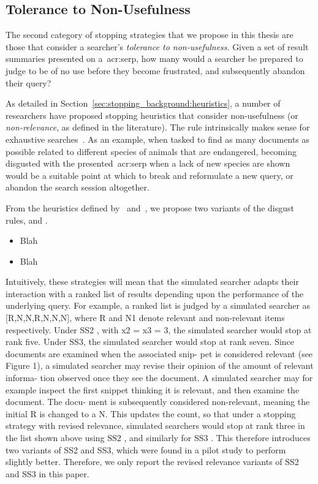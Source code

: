 \subsection{Tolerance to Non-Usefulness}
The second category of stopping strategies that we propose in this thesis are those that consider a searcher's \emph{tolerance to non-usefulness}. Given a set of result summaries presented on a~\gls{acr:serp}, how many would a searcher be prepared to judge to be of no use before they become frustrated, and subsequently abandon their query?

As detailed in Section~\ref{sec:stopping_background:heuristics}, a number of researchers have proposed stopping heuristics that consider non-usefulness (or \emph{non-relevance}, as defined in the literature). The rule intrinsically makes sense for exhaustive searches~\cite{kraft1979stopping_rules}. As an example, when tasked to find as many documents as possible related to different species of animals that are endangered, becoming disgusted with the presented~\gls{acr:serp} when a lack of new species are shown would be a suitable point at which to break and reformulate a new query, or abandon the search session altogether.

From the heuristics defined by~\citealt{cooper1973retrieval_effectiveness_ii} and~\citealt{kraft1979stopping_rules}, we propose two variants of the disgust rules,  and .

\begin{itemize}
    
    \item[]{} Blah
    
    \item[]{} Blah
    
\end{itemize}

Intuitively, these strategies will mean that the simulated searcher adapts their interaction with a ranked list of results depending upon the performance of the underlying query. For example, a ranked list is judged by a simulated searcher as [R,N,N,R,N,N,N], where R and N1 denote relevant and non-relevant items respectively. Under SS2 , with x2 = x3 = 3, the simulated searcher would stop at rank five. Under SS3, the simulated searcher would stop at rank seven.
Since documents are examined when the associated snip- pet is considered relevant (see Figure 1), a simulated searcher may revise their opinion of the amount of relevant informa- tion observed once they see the document. A simulated searcher may for example inspect the first snippet thinking it is relevant, and then examine the document. The docu- ment is subsequently considered non-relevant, meaning the initial R is changed to a N. This updates the count, so that under a stopping strategy with revised relevance, simulated searchers would stop at rank three in the list shown above using SS2 , and similarly for SS3 . This therefore introduces two variants of SS2 and SS3, which were found in a pilot study to perform slightly better. Therefore, we only report the revised relevance variants of SS2 and SS3 in this paper.


